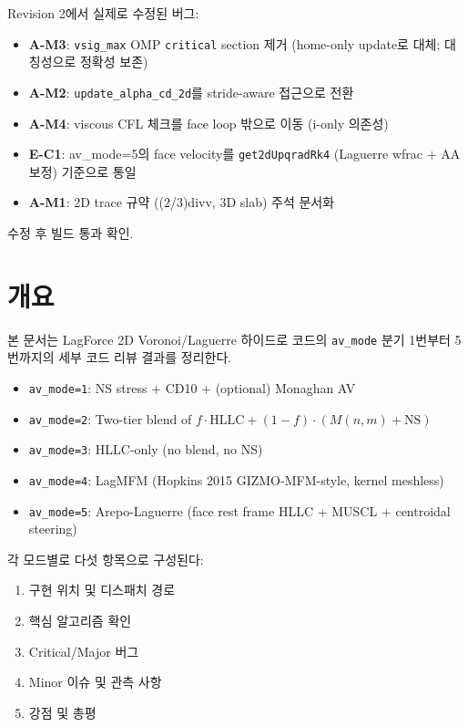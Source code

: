 \documentclass[11pt]{article}
\begin{document}
Revision 2에서 실제로 수정된 버그:
\begin{itemize}
  \item \textbf{A-M3}: \texttt{vsig\_max} OMP \texttt{critical} section 제거
    (home-only update로 대체; 대칭성으로 정확성 보존)
  \item \textbf{A-M2}: \texttt{update\_alpha\_cd\_2d}를 stride-aware 접근으로 전환
  \item \textbf{A-M4}: viscous CFL 체크를 face loop 밖으로 이동 (i-only 의존성)
  \item \textbf{E-C1}: av\_mode=5의 face velocity를 \texttt{get2dUpqradRk4}
    (Laguerre wfrac + AA 보정) 기준으로 통일
  \item \textbf{A-M1}: 2D trace 규약 ((2/3)divv, 3D slab) 주석 문서화
\end{itemize}

수정 후 빌드 통과 확인.

\newpage

\section{개요}

본 문서는 LagForce 2D Voronoi/Laguerre 하이드로 코드의
\texttt{av\_mode} 분기 1번부터 5번까지의 세부 코드 리뷰 결과를 정리한다.

\begin{itemize}
  \item \texttt{av\_mode=1}: NS stress + CD10 + (optional) Monaghan AV
  \item \texttt{av\_mode=2}: Two-tier blend of $f\cdot\mathrm{HLLC} + (1-f)\cdot(M(n,m)+\mathrm{NS})$
  \item \texttt{av\_mode=3}: HLLC-only (no blend, no NS)
  \item \texttt{av\_mode=4}: LagMFM (Hopkins 2015 GIZMO-MFM-style, kernel meshless)
  \item \texttt{av\_mode=5}: Arepo-Laguerre (face rest frame HLLC + MUSCL + centroidal steering)
\end{itemize}

각 모드별로 다섯 항목으로 구성된다:
\begin{enumerate}
  \item 구현 위치 및 디스패치 경로
  \item 핵심 알고리즘 확인
  \item Critical/Major 버그
  \item Minor 이슈 및 관측 사항
  \item 강점 및 총평
\end{enumerate}
\end{document}
